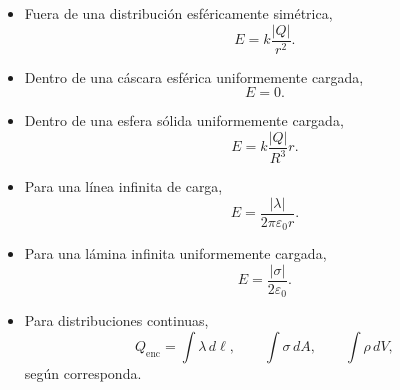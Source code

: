 \begin{resumen}
\begin{itemize}
    \item Fuera de una distribución esféricamente simétrica,
    \[
    \boxed{E=k\frac{|Q|}{r^2}}.
    \]

    \item Dentro de una cáscara esférica uniformemente cargada,
    \[
    \boxed{E=0}.
    \]

    \item Dentro de una esfera sólida uniformemente cargada,
    \[
    \boxed{E=k\frac{|Q|}{R^3}r}.
    \]

    \item Para una línea infinita de carga,
    \[
    \boxed{E=\frac{|\lambda|}{2\pi\varepsilon_0r}}.
    \]

    \item Para una lámina infinita uniformemente cargada,
    \[
    \boxed{E=\frac{|\sigma|}{2\varepsilon_0}}.
    \]

    \item Para distribuciones continuas,
    \[
    Q_{\text{enc}}
    =
    \int\lambda\,d\ell,
    \qquad
    \int\sigma\,dA,
    \qquad
    \int\rho\,dV,
    \]
    según corresponda.
\end{itemize}

\end{resumen}